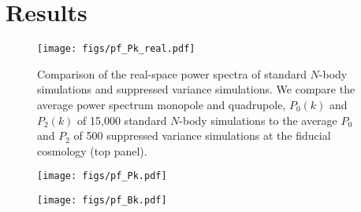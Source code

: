 \section{Results} \label{sec:results} 

\begin{figure}
\begin{center}
    \texttt{[image: figs/pf\_Pk\_real.pdf]} 
    \caption{Comparison of the real-space power spectra of standard $N$-body 
    simulations and suppressed variance simulations. We compare the average 
    power spectrum monopole and quadrupole, $P_0(k)$ and $P_2(k)$ of 15,000 
    standard $N$-body simulations to the average $P_0$ and $P_2$ of 500 
    suppressed variance simulations at the fiducial cosmology (top panel).
    }
\label{fig:pk_real}
\end{center}
\end{figure}

\begin{figure}
\begin{center}
    \texttt{[image: figs/pf\_Pk.pdf]} 
    \caption{}
\label{fig:pk_rsd}
\end{center}
\end{figure}

\begin{figure}
\begin{center}
    \texttt{[image: figs/pf\_Bk.pdf]} 
    \caption{}
\label{fig:bk_real}
\end{center}
\end{figure}
